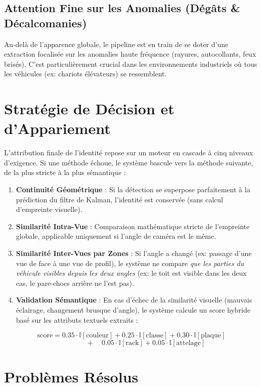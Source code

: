 \documentclass[12pt, a4paper]{article}
\begin{document}
\subsection{Attention Fine sur les Anomalies (Dégâts \& Décalcomanies)}
Au-delà de l'apparence globale, le pipeline est en train de se doter d'une extraction focalisée sur les anomalies haute fréquence (rayures, autocollants, feux brisés). C'est particulièrement crucial dans les environnements industriels où tous les véhicules (ex: chariots élévateurs) se ressemblent.

\section{Stratégie de Décision et d'Appariement}

L'attribution finale de l'identité repose sur un moteur en cascade à cinq niveaux d'exigence. Si une méthode échoue, le système bascule vers la méthode suivante, de la plus stricte à la plus sémantique :

\begin{enumerate}
    \item \textbf{Continuité Géométrique} : Si la détection se superpose parfaitement à la prédiction du filtre de Kalman, l'identité est conservée (sans calcul d'empreinte visuelle).
    \item \textbf{Similarité Intra-Vue} : Comparaison mathématique stricte de l'empreinte globale, applicable uniquement si l'angle de caméra est le même.
    \item \textbf{Similarité Inter-Vues par Zones} : Si l'angle a changé (ex: passage d'une vue de face à une vue de profil), le système ne compare \textit{que les parties du véhicule visibles depuis les deux angles} (ex: le toit est visible dans les deux cas, le pare-chocs arrière ne l'est pas).
    \item \textbf{Validation Sémantique} : En cas d'échec de la similarité visuelle (mauvais éclairage, changement brusque d'angle), le système calcule un score hybride basé sur les attributs textuels extraits :
\end{enumerate}

$$ \text{score} = 0.35 \cdot \mathbb{I}[\text{couleur}] + 0.25 \cdot \mathbb{I}[\text{classe}] + 0.30 \cdot \mathbb{I}[\text{plaque}] $$
$$ \qquad\qquad + \quad 0.05 \cdot \mathbb{I}[\text{rack}] + 0.05 \cdot \mathbb{I}[\text{attelage}] $$

\section{Problèmes Résolus}
\end{document}
